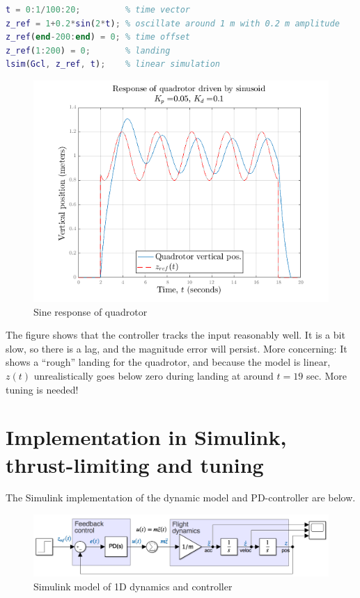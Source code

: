 \documentclass[a4paper]{report}
\begin{document}
\begin{lstlisting}[language=Matlab, style=Matlab-editor]
t = 0:1/100:20;         % time vector
z_ref = 1+0.2*sin(2*t);	% oscillate around 1 m with 0.2 m amplitude
z_ref(end-200:end) = 0; % time offset
z_ref(1:200) = 0;       % landing
lsim(Gcl, z_ref, t);	% linear simulation
\end{lstlisting}

\begin{figure}[H]
\centering
\includegraphics[width=12cm]{img/sin_1d.png}
\caption{Sine response of quadrotor\label{fig:sin_1d}}
\end{figure}

The figure shows that the controller tracks the input reasonably well. It is a bit slow, so there is a lag, and the magnitude error will persist.
More concerning: It shows a ``rough'' landing for the quadrotor, and because the model is linear, $z(t)$ unrealistically goes below zero during landing at around $t=19$ sec. 
More tuning is needed!

\section{Implementation in Simulink, thrust-limiting and tuning}

The Simulink implementation of the dynamic model and PD-controller are below. 

\begin{figure}[H]
\centering
\includegraphics[width=14cm]{img/simulink_1d_1.png}
\caption{Simulink model of 1D dynamics and controller\label{fig:simulink_1d_1}}
\end{figure}
\end{document}

